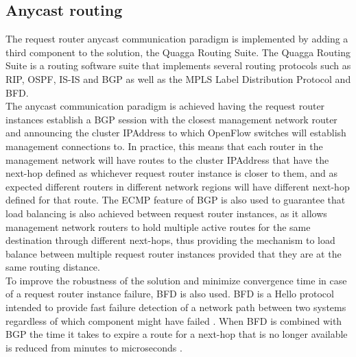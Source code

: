 \subsection{Anycast routing}
\label{subsection:anycast-implementation}
The request router anycast communication paradigm is implemented by adding a third component to the solution, the Quagga Routing Suite.
The Quagga Routing Suite is a routing software suite that implements several routing protocols such as \gls{RIP}, \gls{OSPF}, \gls{IS-IS} and \gls{BGP} as well as the \gls{MPLS} Label Distribution Protocol and \gls{BFD}.\\
%
The anycast communication paradigm is achieved having the request router instances establish a \gls{BGP} session with the closest management network router and announcing the cluster \gls{IPAddress} to which OpenFlow switches will establish management connections to.
In practice, this means that each router in the management network will have routes to the cluster \gls{IPAddress} that have the next-hop defined as whichever request router instance is closer to them, and as expected different routers in different network regions will have different next-hop defined for that route.
The \gls{ECMP} feature of \gls{BGP} is also used to guarantee that load balancing is also achieved between request router instances, as it allows management network routers to hold multiple active routes for the same destination through different next-hops, thus providing the mechanism to load balance between multiple request router instances provided that they are at the same routing distance.\\
%
To improve the robustness of the solution and minimize convergence time in case of a request router instance failure, \gls{BFD} is also used.
\gls{BFD} is a Hello protocol intended to provide fast failure detection of a network path between two systems regardless of which component might have failed \cite{rfc5880}.
When \gls{BFD} is combined with \gls{BGP} the time it takes to expire a route for a next-hop that is no longer available is reduced from minutes to microseconds \cite{rfc5880}\cite{rfc4271}.
